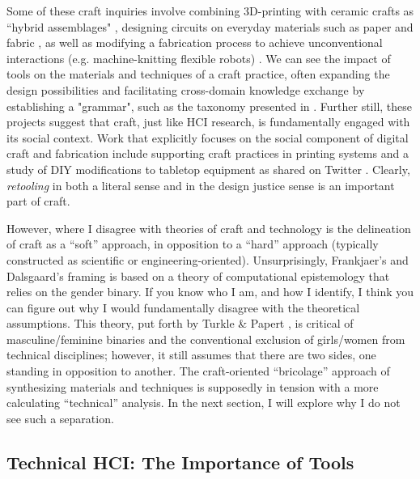 Some of these craft inquiries involve
combining 3D-printing with ceramic crafts as ``hybrid assemblages" \cite{efrat_hybrid_2016}, designing circuits on everyday materials such as paper and fabric , as well as modifying a fabrication process to achieve unconventional interactions (e.g. machine-knitting flexible robots) \cite{albaugh_digital_2019}. 
We can see the impact of tools on the materials and techniques of a craft practice, often expanding the design possibilities and facilitating cross-domain knowledge exchange by establishing a "grammar", such as the taxonomy presented in \todo{[137]}. Further still, these projects suggest that craft, just like HCI research, is fundamentally engaged with its social context. Work that explicitly focuses on the social component of digital craft and fabrication include supporting craft practices in printing systems \todo{[136]}and a study of DIY modifications to tabletop equipment as shared on Twitter \todo{[139]}. Clearly, \textit{retooling} in both a literal sense and in the design justice sense is an important part of craft.

However, where I disagree with theories of craft and technology is the delineation of craft as a ``soft'' approach, in opposition to a ``hard'' approach (typically constructed as scientific or engineering-oriented). Unsurprisingly, Frankjaer's and Dalsgaard's framing is based on a theory of computational epistemology that relies on the gender binary. If you know who I am, and how I identify, I think you can figure out why I would fundamentally disagree with the theoretical assumptions. This theory, put forth by Turkle \& Papert \cite{turkle_epistemological_1990}, is critical of masculine/feminine binaries and the conventional exclusion of girls/women from technical disciplines; however, it still assumes that there are two sides, one standing in opposition to another. The craft-oriented ``bricolage'' approach of synthesizing materials and techniques is supposedly in tension with a more calculating ``technical'' analysis. In the next section, I will explore why I do not see such a separation.

\subsection{Technical HCI: The Importance of Tools}

